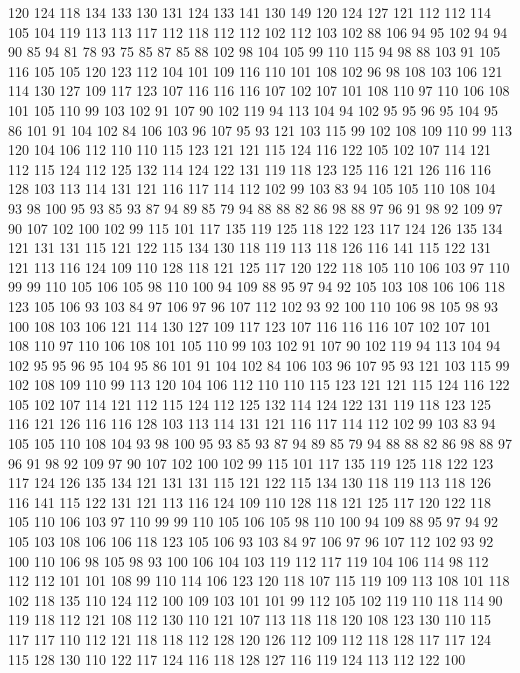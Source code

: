120 124 118 134 133 130 131 124 133 141 130 149 120 124 127 121 112 112 114 105
104 119 113 113 117 112 118 112 112 102 112 103 102 88 106 94 95 102 94 94
90 85 94 81 78 93 75 85 87 85 88 102 98 104 105 99 110 115 94 98
88 103 91 105 116 105 105 120 123 112 104 101 109 116 110 101 108 102 96 98
108 103 106 121 114 130 127 109 117 123 107 116 116 116 107 102 107 101 108 110
97 110 106 108 101 105 110 99 103 102 91 107 90 102 119 94 113 104 94 102
95 95 96 95 104 95 86 101 91 104 102 84 106 103 96 107 95 93 121 103
115 99 102 108 109 110 99 113 120 104 106 112 110 110 115 123 121 121 115 124
116 122 105 102 107 114 121 112 115 124 112 125 132 114 124 122 131 119 118 123
125 116 121 126 116 116 128 103 113 114 131 121 116 117 114 112 102 99 103 83
94 105 105 110 108 104 93 98 100 95 93 85 93 87 94 89 85 79 94 88
88 82 86 98 88 97 96 91 98 92 109 97 90 107 102 100 102 99 115 101
117 135 119 125 118 122 123 117 124 126 135 134 121 131 131 115 121 122 115 134
130 118 119 113 118 126 116 141 115 122 131 121 113 116 124 109 110 128 118 121
125 117 120 122 118 105 110 106 103 97 110 99 99 110 105 106 105 98 110 100
94 109 88 95 97 94 92 105 103 108 106 106 118 123 105 106 93 103 84 97
106 97 96 107 112 102 93 92 100 110 106 98 105 98 93 100 108 103 106 121
114 130 127 109 117 123 107 116 116 116 107 102 107 101 108 110 97 110 106 108
101 105 110 99 103 102 91 107 90 102 119 94 113 104 94 102 95 95 96 95
104 95 86 101 91 104 102 84 106 103 96 107 95 93 121 103 115 99 102 108
109 110 99 113 120 104 106 112 110 110 115 123 121 121 115 124 116 122 105 102
107 114 121 112 115 124 112 125 132 114 124 122 131 119 118 123 125 116 121 126
116 116 128 103 113 114 131 121 116 117 114 112 102 99 103 83 94 105 105 110
108 104 93 98 100 95 93 85 93 87 94 89 85 79 94 88 88 82 86 98
88 97 96 91 98 92 109 97 90 107 102 100 102 99 115 101 117 135 119 125
118 122 123 117 124 126 135 134 121 131 131 115 121 122 115 134 130 118 119 113
118 126 116 141 115 122 131 121 113 116 124 109 110 128 118 121 125 117 120 122
118 105 110 106 103 97 110 99 99 110 105 106 105 98 110 100 94 109 88 95
97 94 92 105 103 108 106 106 118 123 105 106 93 103 84 97 106 97 96 107
112 102 93 92 100 110 106 98 105 98 93 100 106 104 103 119 112 117 119 104
106 114 98 112 112 112 101 101 108 99 110 114 106 123 120 118 107 115 119 109
113 108 101 118 102 118 135 110 124 112 100 109 103 101 101 99 112 105 102 119
110 118 114 90 119 118 112 121 108 112 130 110 121 107 113 118 118 120 108 123
130 110 115 117 117 110 112 121 118 118 112 128 120 126 112 109 112 118 128 117
117 124 115 128 130 110 122 117 124 116 118 128 127 116 119 124 113 112 122 100

